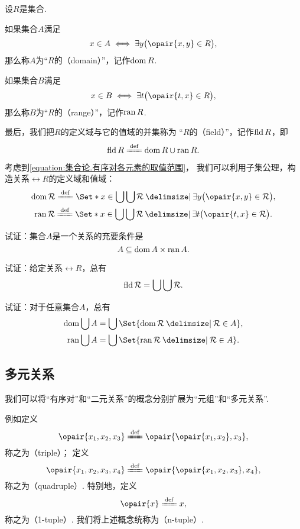 \begin{definition}
设\(R\)是集合.

如果集合\(A\)满足\[
	x \in A \iff \exists y \bigl( \opair{x,y} \in R \bigr),
\]
那么称\(A\)为“\(R\)的（domain）”，记作\(\operatorname{dom} R\).

如果集合\(B\)满足\[
	x \in B \iff \exists t \bigl( \opair{t,x} \in R \bigr),
\]
那么称\(B\)为“\(R\)的（range）”，记作\(\operatorname{ran} R\).

最后，我们把\(R\)的定义域与它的值域的并集称为
“\(R\)的（field）”，记作\(\operatorname{fld} R\)，即\[
	\fld R \defeq \dom R \cup \ran R.
\]
\end{definition}

考虑到\cref{equation:集合论.有序对各元素的取值范围}，
我们可以利用子集公理，构造关系\(\rel{R}\)的定义域和值域：
\begin{gather}
	\dom \rel{R}
	\defeq
	\Set*{ x \in \bigcup\bigcup\rel{R} \given \exists y \bigl( \opair{x,y} \in \rel{R} \bigr) }, \\
	\ran \rel{R}
	\defeq
	\Set*{ x \in \bigcup\bigcup\rel{R} \given \exists t \bigl( \opair{t,x} \in \rel{R} \bigr) }.
\end{gather}

\begin{example}
试证：集合\(A\)是一个关系的充要条件是\[
	A \subseteq \operatorname{dom} A \times \operatorname{ran} A.
\]
\end{example}

\begin{example}
试证：给定关系\(\rel{R}\)，总有\[
	\operatorname{fld} \mathcal{R} = \bigcup\bigcup \mathcal{R}.
\]
\end{example}

\begin{example}
试证：对于任意集合\(A\)，总有\begin{gather}
	\dom\bigcup A = \bigcup\Set{ \dom\rel{R} \given \rel{R} \in A }, \\
	\ran\bigcup A = \bigcup\Set{ \ran\rel{R} \given \rel{R} \in A }.
\end{gather}
\end{example}

\subsection{多元关系}
我们可以将“有序对”和“二元关系”的概念分别扩展为“元组”和“多元关系”.

例如定义\[
	\opair{x_1,x_2,x_3}
	\defeq
	\opair{\opair{x_1,x_2},x_3},
\]称之为（triple）；
定义\[
	\opair{x_1,x_2,x_3,x_4}
	\defeq
	\opair{\opair{x_1,x_2,x_3},x_4},
\]称之为（quadruple）.
特别地，定义\[
	\opair{x}
	\defeq
	x,
\]称之为（1-tuple）.
我们将上述概念统称为（n-tuple）.

